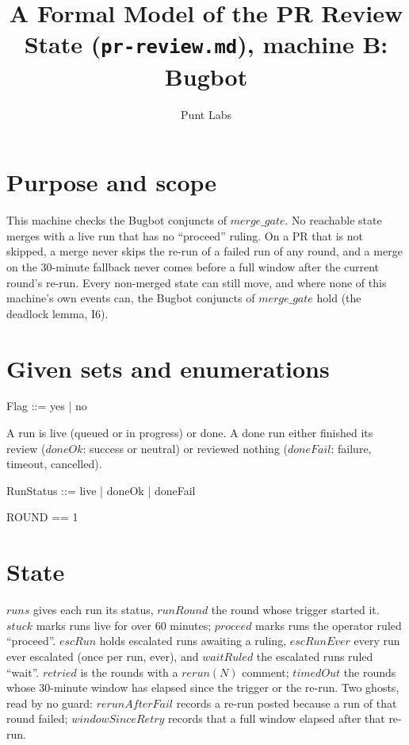 \documentclass{article}
\begin{document}
\title{A Formal Model of the PR Review State (\texttt{pr-review.md}), machine B: Bugbot}
\author{Punt Labs}
\maketitle

\section{Purpose and scope}

This machine checks the Bugbot conjuncts of $merge\_gate$. No reachable state
merges with a live run that has no ``proceed'' ruling. On a PR that is not
skipped, a merge never skips the re-run of a failed run of any round, and a
merge on the 30-minute fallback never comes before a full window after the
current round's re-run. Every non-merged
state can still move, and where none of this machine's own events can, the
Bugbot conjuncts of $merge\_gate$ hold (the deadlock lemma, I6).

\section{Given sets and enumerations}

\begin{zed}
  [RUN]
\end{zed}

\begin{zed}
  Flag ::= yes | no
\end{zed}

A run is live (queued or in progress) or done. A done run either finished its
review ($doneOk$: success or neutral) or reviewed nothing ($doneFail$: failure,
timeout, cancelled).

\begin{zed}
  RunStatus ::= live | doneOk | doneFail
\end{zed}

\begin{zed}
  ROUND == 1 
\end{zed}

\section{State}

$runs$ gives each run its status, $runRound$ the round whose trigger started
it. $stuck$ marks runs live for over 60 minutes; $proceed$ marks runs the
operator ruled ``proceed''. $escRun$ holds escalated runs awaiting a ruling,
$escRunEver$ every run ever escalated (once per run, ever), and $waitRuled$ the
escalated runs ruled ``wait''. $retried$ is the rounds with a $rerun(N)$
comment; $timedOut$ the rounds whose 30-minute window has elapsed since the
trigger or the re-run. Two ghosts, read by no guard: $rerunAfterFail$ records
a re-run posted because a run of that round failed; $windowSinceRetry$
records that a full window elapsed after that re-run.
\end{document}
